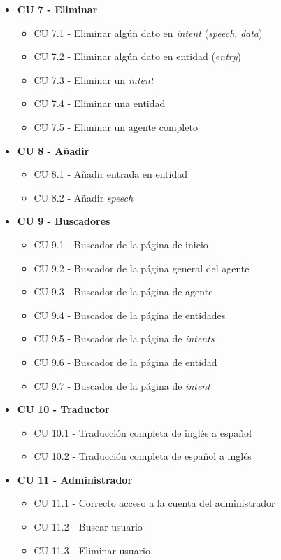\begin{itemize}
    \item \textbf{CU 7 - Eliminar}
    \begin{itemize}
        \item CU 7.1 - Eliminar algún dato en \textit{intent} (\textit{speech}, \textit{data})
        \item CU 7.2 - Eliminar algún dato en entidad (\textit{entry})
        \item CU 7.3 - Eliminar un \textit{intent}
        \item CU 7.4 - Eliminar una entidad
        \item CU 7.5 - Eliminar un agente completo
    \end{itemize}

    \item \textbf{CU 8 - Añadir}
    \begin{itemize}
        \item CU 8.1 - Añadir entrada en entidad
        \item CU 8.2 - Añadir \textit{speech}
    \end{itemize}

    \item \textbf{CU 9 - Buscadores}
    \begin{itemize}
        \item CU 9.1 - Buscador de la página de inicio
        \item CU 9.2 - Buscador de la página general del agente
        \item CU 9.3 - Buscador de la página de agente
        \item CU 9.4 - Buscador de la página de entidades
        \item CU 9.5 - Buscador de la página de \textit{intents}
        \item CU 9.6 - Buscador de la página de entidad
        \item CU 9.7 - Buscador de la página de \textit{intent}
    \end{itemize}

    \item \textbf{CU 10 - Traductor}
    \begin{itemize}
        \item CU 10.1 - Traducción completa de inglés a español
        \item CU 10.2 - Traducción completa de español a inglés
    \end{itemize}

    \item \textbf{CU 11 - Administrador}
    \begin{itemize}
        \item CU 11.1 - Correcto acceso a la cuenta del administrador
        \item CU 11.2 - Buscar usuario
        \item CU 11.3 - Eliminar usuario
    \end{itemize}
\end{itemize}

